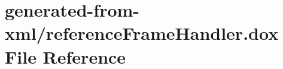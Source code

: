 \hypertarget{referenceFrameHandler_8dox}{}\section{generated-\/from-\/xml/reference\+Frame\+Handler.dox File Reference}
\label{referenceFrameHandler_8dox}
